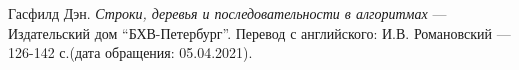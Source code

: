\begin{thebibliography}{99}
Гасфилд Дэн.
{\itshape Строки, деревья и последовательности в алгоритмах} --- Издательский дом \enquote{БХВ-Петербург}. Перевод с английского: И.В. Романовский --- 126-142 с.(дата обращения: 05.04.2021).
\end{thebibliography}
\pagebreak
